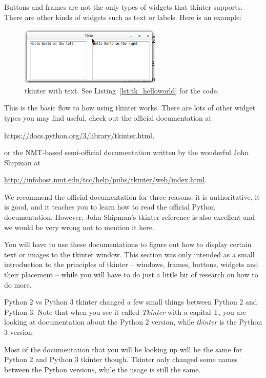 \documentclass[11pt]{cselabheader}
\begin{document}
Buttons and frames are not the only types of widgets that tkinter supports.
There are other kinds of widgets such as text or labels. Here is an example:



\begin{figure}[h]
  \centering
  \includegraphics[width=0.6\textwidth]{img/tk_helloworld.png}
  \caption{tkinter with text. See Listing~\ref{lst:tk_helloworld} for the code.}
  \label{fig:tk_helloworld}
\end{figure}

\pagebreak

This is the basic flow to how using tkinter works. There are lots of other
widget types you may find useful, check out the official documentation
at 
\begin{center}
  \url{https://docs.python.org/3/library/tkinter.html}, 
\end{center}
or the NMT-based semi-official documentation written by the wonderful John
Shipman at
\begin{center}
\url{http://infohost.nmt.edu/tcc/help/pubs/tkinter/web/index.html}.
\end{center}

We recommend the official documentation for three reasons: it is authoritative,
it is good, and it teaches you to learn how to read the official Python
documentation. However, John Shipman's tkinter reference is also excellent and
we would be very wrong not to mention it here.

You will have to use these documentations to figure out how to display certain
text or images to the tkinter window. This section was only intended as a small
introduction to the principles of tkinter -- windows, frames, buttons, widgets
and their placement -- while you will have to do just a little bit of research
on how to do more.

\begin{warningbox}{Python 2 vs Python 3}
  tkinter changed a few small things between Python 2 and Python 3. Note that
  when you see it called \emph{Tkinter} with a capital T, you are looking at
  documentation about the Python 2 version, while \emph{tkinter} is the Python 3
  version.

  Most of the documentation that you will be looking up will be the same for
  Python 2 and Python 3 tkinter though. Tkinter only changed some names between
  the Python versions, while the usage is still the same.
\end{warningbox}
\end{document}
